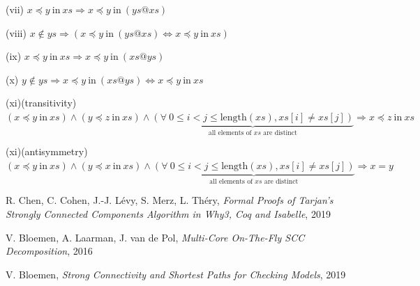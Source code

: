 \documentclass[a4 paper, 12pt]{article}
\theoremstyle{definition}
\begin{document}
\begin{flushleft}
    (vii)
    $x \preceq y~\text{in}~xs \Longrightarrow x \preceq y~\text{in}~(ys @ xs)$
\end{flushleft}

\begin{flushleft}
    (viii)
    $x \notin ys \Longrightarrow (x \preceq y~\text{in}~(ys @ xs) \Longleftrightarrow x \preceq y~\text{in}~xs)$
\end{flushleft}

\begin{flushleft}
    (ix)
    $x \preceq y~\text{in}~xs \Longrightarrow x \preceq y~\text{in}~(xs @ ys)$
\end{flushleft}

\begin{flushleft}
    (x)
    $y \notin ys \Longrightarrow x \preceq y~\text{in}~(xs @ ys) \Longleftrightarrow x \preceq y~\text{in}~xs$
\end{flushleft}

\begin{flushleft}
    (xi)(transitivity)
    $(x \preceq y~\text{in}~xs) \wedge (y \preceq z~\text{in}~xs) \wedge \underset{\text{all elements of $xs$ are distinct}}{\underbrace{(\forall~0 \leq i < j \leq \text{length}(xs), xs[i] \neq xs[j])}} \Longrightarrow x \preceq z~\text{in}~xs$
\end{flushleft}

\begin{flushleft}
    (xi)(antisymmetry)
    $(x \preceq y~\text{in}~xs) \wedge (y \preceq x~\text{in}~xs) \wedge \underset{\text{all elements of $xs$ are distinct}}{\underbrace{(\forall~0 \leq i < j \leq \text{length}(xs), xs[i] \neq xs[j])}} \Longrightarrow x = y$
\end{flushleft}


\pagebreak


\begin{thebibliography}{99}

 R. Chen, C. Cohen, J.-J. Lévy, S. Merz, L. Théry, \emph{Formal Proofs of Tarjan’s Strongly Connected Components Algorithm in Why3, Coq and Isabelle}, 2019

 V. Bloemen, A. Laarman, J. van de Pol, \emph{Multi-Core On-The-Fly SCC Decomposition}, 2016

 V. Bloemen, \emph{Strong Connectivity and Shortest Paths for Checking Models}, 2019

\end{thebibliography}
\end{document}
